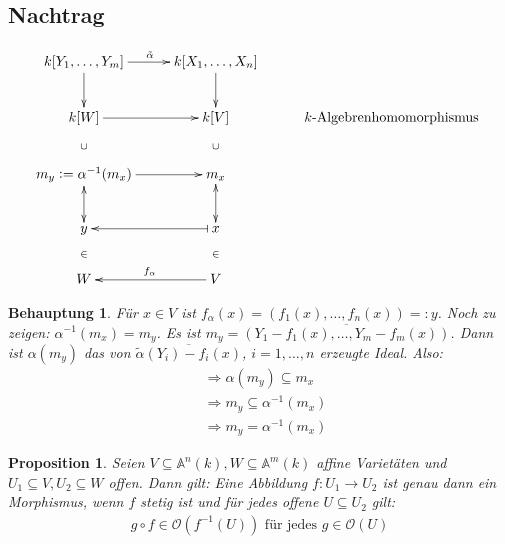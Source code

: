 \documentclass[a4paper,12pt]{report}
\theoremstyle{break}
\newtheorem{Prop}[Def]{Proposition}
\theoremstyle{nonumberbreak}
\newtheorem{Beh}{Behauptung}
\theoremstyle{nonumberplain}
\newcommand{\defeqr}[0]{\mathrel{\mathop:}=}
\newcommand{\defeql}[0]{=\mathrel{\mathop:}}
\begin{document}
\subsection*{Nachtrag}
\[
\begin{xy}
\xymatrix{
k[Y_1,\dots,Y_m]\ar[r]^{\tilde{\alpha}}\ar[d]&k[X_1,\dots,X_n]\ar[d] \\
k[W]\ar[r]\ar@{}[d]|{\cup}&k[V]\ar@{}[d]|{\cup}&\text{ $k$-Algebrenhomomorphismus } \\
m_y\defeqr\alpha^{-1}(m_x)\ar[r]\ar@{<->}[d]&m_x\ar@{<->}[d] \\
y\ar@{}[d]|{\in}& x\ar@{|->}[l]\ar@{}[d]|{\in}\\
W&V\ar[l]_{f_\alpha}
}
\end{xy}
\]
\begin{Beh}
Für $x \in V$ ist $f_\alpha(x)=(f_1(x),\dots,f_n(x))\defeql y$. Noch zu zeigen: $\alpha^{-1}(m_x)=m_y$. Es ist $m_y=\overline{(Y_1-f_1(x),\dots,Y_m-f_m(x))}$. Dann ist $\alpha(m_y)$ das von $\overline{\tilde{\alpha}(Y_i)-f_i(x)}$, $i=1,\dots,n$ erzeugte Ideal. Also:
\begin{align*}
&\Rightarrow \alpha(m_y)\subseteq m_x \\
&\Rightarrow m_y\subseteq\alpha^{-1}(m_x) \\
&\Rightarrow m_y=\alpha^{-1}(m_x)
\end{align*}
\end{Beh}
\begin{Prop}
\label{prop:6.9}
  Seien $V\subseteq\mathbb A^n(k), W\subseteq\mathbb A^m(k)$ affine Varietäten und $U_1\subseteq V, U_2\subseteq W$ offen. Dann gilt: Eine Abbildung $f:U_1\longrightarrow U_2$ ist genau dann ein Morphismus, wenn $f$ stetig ist und für jedes offene $U\subseteq U_2$ gilt:
  \begin{align*}
    g\circ f \in \mathcal O(f^{-1}(U)) \text{ für jedes } g\in\mathcal O(U)
  \end{align*}

\end{Prop}
\end{document}
